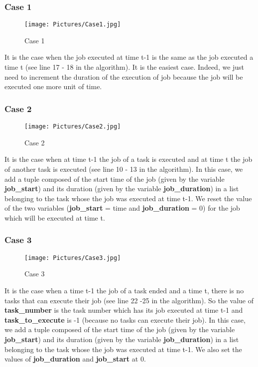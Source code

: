 \documentclass[a4paper,12pt]{article}
\begin{document}
\subsubsection{Case 1}

\begin{figure}[h!]
  \centering
  \texttt{[image: Pictures/Case1.jpg]}
  \caption{Case 1}
  \label{fig: Case 1}
\end{figure}

\smallskip
\noindent
It is the case when the job executed at time t-1 is the same as the job executed a time t (see line 17 - 18 in the algorithm). It is the easiest case. Indeed, we just need to increment the duration of the execution of job because the job will be executed one more unit of time. 


\newpage

\subsubsection{Case 2}

\begin{figure}[h!]
  \centering
  \texttt{[image: Pictures/Case2.jpg]}
  \caption{Case 2}
  \label{fig: Case 2}
\end{figure}

\smallskip
\noindent
It is the case when at time t-1 the job of a task is executed and at time t the job of another task is executed (see line 10 - 13 in the algorithm). In this case, we add a tuple composed of the start time of the job (given by the variable \textbf{job\_start}) and its duration (given by the variable \textbf{job\_duration}) in a list belonging to the task whose the job was executed at time t-1. We reset the value of the two variables (\textbf{job\_start} = time and \textbf{job\_duration} = 0) for the job which will be executed at time t. 

\newpage
\subsubsection{Case 3}

\begin{figure}[h!]
  \centering
  \texttt{[image: Pictures/Case3.jpg]}
  \caption{Case 3}
  \label{fig: Case 3}
\end{figure}

\smallskip
\noindent
It is the case when a time t-1 the job of a task ended and a time t, there is no tasks that can execute their job (see line 22 -25 in the algorithm). So the value of \textbf{task\_number} is the task number which has its job executed at time t-1 and \textbf{task\_to\_execute} is -1 (because no tasks can execute their job). In this case, we add a tuple composed of the start time of the job (given by the variable \textbf{job\_start}) and its duration (given by the variable \textbf{job\_duration}) in a list belonging to the task whose the job was executed at time t-1. We also set the values of \textbf{job\_duration} and \textbf{job\_start} at 0.
\end{document}
